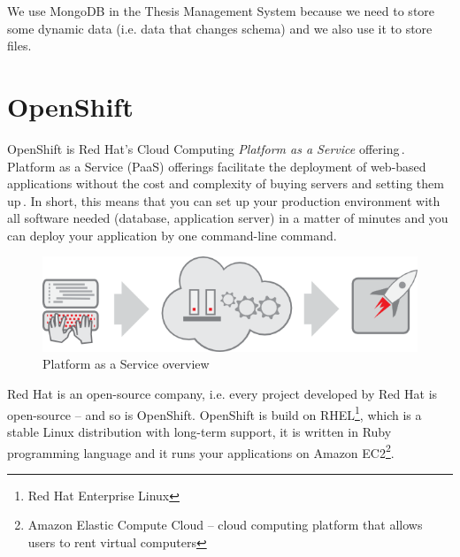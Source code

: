 We use MongoDB in the Thesis Management System because we need to store some dynamic data (i.e. data that changes schema) and we also use it to store files.

\section{OpenShift}

OpenShift is Red Hat's Cloud Computing \emph{Platform as a Service} offering\,\cite{openshift-homepage}. Platform as a Service (PaaS) offerings facilitate the deployment of web-based applications without the cost and complexity of buying servers and setting them up\,\cite{guardian-google-paas}. In short, this means that you can set up your production environment with all software needed (database, application server) in a matter of minutes and you can deploy your application by one command-line command.

\begin{figure}[htbp]
    \centering
        \includegraphics[scale=0.5]{./images/overview-paas.png}
    \caption{Platform as a Service overview\,\cite{openshift-homepage}}
    \label{fig:overview-paas}
\end{figure}

Red Hat is an open-source company, i.e. every project developed by Red Hat is open-source -- and so is OpenShift. OpenShift is build on RHEL\footnote{Red Hat Enterprise Linux}, which is a stable Linux distribution with long-term support, it is written in Ruby programming language and it runs your applications on Amazon EC2\footnote{Amazon Elastic Compute Cloud -- cloud computing platform that allows users to rent virtual computers}.


